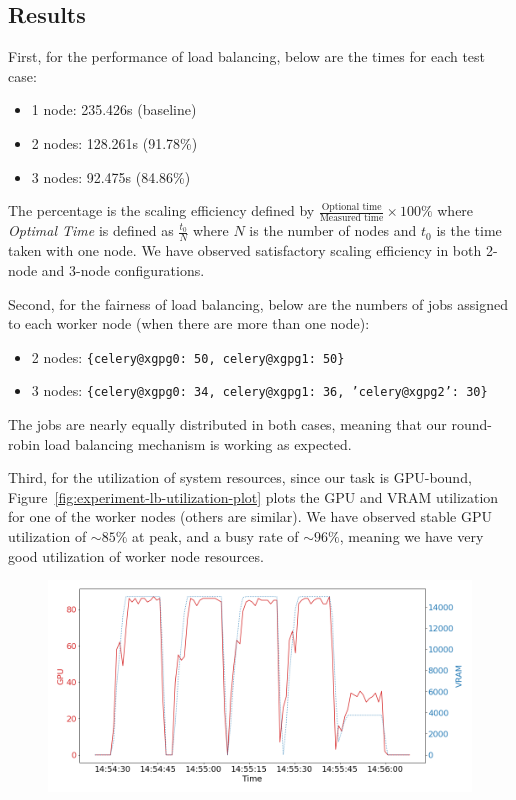 \subsection{Results}
\label{ss:load-balancing-exp-results}

First, for the performance of load balancing, below are the times for each test case:

\begin{itemize}
    \item 1 node: 235.426s (baseline)
    \item 2 nodes: 128.261s (91.78\%)
    \item 3 nodes: 92.475s (84.86\%)
\end{itemize}
The percentage is the scaling efficiency defined by $\frac{\text{Optional time}}{\text{Measured time}}\times 100\%$ where \emph{Optimal Time} is defined as $\frac{t_0}{N}$ where $N$ is the number of nodes and $t_0$ is the time taken with one node. We have observed satisfactory scaling efficiency in both 2-node and 3-node configurations.

Second, for the fairness of load balancing, below are the numbers of jobs assigned to each worker node (when there are more than one node):

\begin{itemize}
    \item 2 nodes: \texttt{\{celery@xgpg0: 50, celery@xgpg1: 50\}}
    \item 3 nodes: \texttt{\{celery@xgpg0: 34, celery@xgpg1: 36, 'celery@xgpg2': 30\}}
\end{itemize}
The jobs are nearly equally distributed in both cases, meaning that our round-robin load balancing mechanism is working as expected.

Third, for the utilization of system resources, since our task is GPU-bound, Figure~\ref{fig:experiment-lb-utilization-plot} plots the GPU and VRAM utilization for one of the worker nodes (others are similar). We have observed stable GPU utilization of $\sim 85\%$ at peak, and a busy rate of $\sim 96\%$, meaning we have very good utilization of worker node resources.

\begin{figure}[H]
    \centering
    \includegraphics[width=\textwidth]{images/worker-utilization.png}
\end{figure}

